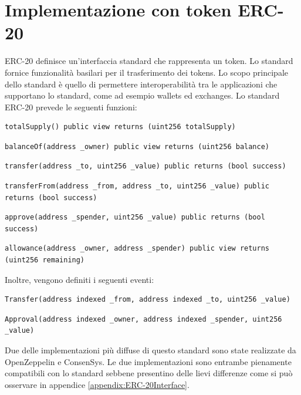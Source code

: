 \section{Implementazione con token ERC-20}
ERC-20 definisce un'interfaccia standard che rappresenta un token. Lo standard fornice funzionalità basilari per il trasferimento dei tokens. Lo scopo principale dello standard è quello di permettere interoperabilità tra le applicazioni che supportano lo standard, come ad esempio wallets ed exchanges. 
Lo standard ERC-20 prevede le seguenti funzioni:
\begin{lstlisting}[language=Solidity,numbers=none]
totalSupply() public view returns (uint256 totalSupply)
\end{lstlisting} 
\begin{lstlisting}[language=Solidity,numbers=none]
balanceOf(address _owner) public view returns (uint256 balance)\end{lstlisting}
\begin{lstlisting}[language=Solidity,numbers=none] 
transfer(address _to, uint256 _value) public returns (bool success)\end{lstlisting} 
\begin{lstlisting}[language=Solidity,numbers=none]
transferFrom(address _from, address _to, uint256 _value) public returns (bool success)
\end{lstlisting}
\begin{lstlisting}[language=Solidity,numbers=none]
approve(address _spender, uint256 _value) public returns (bool success)
\end{lstlisting}
\begin{lstlisting}[language=Solidity,numbers=none]
allowance(address _owner, address _spender) public view returns (uint256 remaining)
\end{lstlisting}
Inoltre, vengono definiti i seguenti eventi:
\begin{lstlisting}[language=Solidity,numbers=none]
Transfer(address indexed _from, address indexed _to, uint256 _value)
\end{lstlisting}
\begin{lstlisting}[language=Solidity,numbers=none]
Approval(address indexed _owner, address indexed _spender, uint256 _value)
\end{lstlisting}
Due delle implementazioni più diffuse di questo standard sono state realizzate da OpenZeppelin e ConsenSys. Le due implementazioni sono entrambe pienamente compatibili con lo standard sebbene presentino delle lievi differenze come si può osservare in appendice \ref{appendix:ERC-20Interface}.

